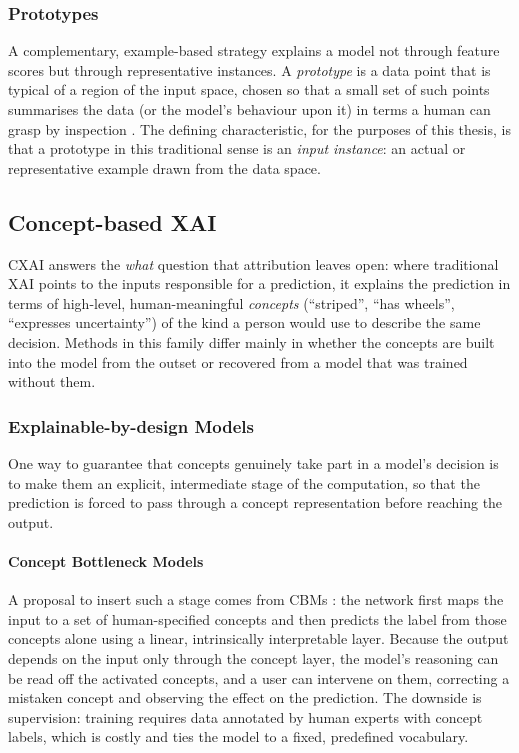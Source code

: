\subsubsection{Prototypes}
\label{sec:background:xai:trad-xai:prototypes}

A complementary, example-based strategy explains a model not through feature
scores but through representative instances. A \textit{prototype} is a data
point that is typical of a region of the input space, chosen so that a small set
of such points summarises the data (or the model's behaviour upon it) in terms a
human can grasp by inspection \citep{kimExamplesAreNot2016}. The defining
characteristic, for the purposes of this thesis, is that a prototype in this
traditional sense is an \textit{input instance}: an actual or representative
example drawn from the data space.

\subsection{Concept-based XAI} \label{sec:background:xai:c-xai}

\Ac{CXAI} answers the \textit{what} question that attribution leaves open: where
traditional \ac{XAI} points to the inputs responsible for a prediction, it
explains the prediction in terms of high-level, human-meaningful
\textit{concepts} (``striped'', ``has wheels'', ``expresses uncertainty'') of
the kind a person would use to describe the same decision. Methods in this
family differ mainly in whether the concepts are built into the model from the
outset or recovered from a model that was trained without them.

\subsubsection{Explainable-by-design Models}

One way to guarantee that concepts genuinely take part in a model's decision is
to make them an explicit, intermediate stage of the computation, so that the
prediction is forced to pass through a concept representation before reaching
the output.

    \paragraph{Concept Bottleneck Models} A proposal to insert such a stage
    comes from \acp{CBM} \citep{kohConceptBottleneckModels2020}: the network
    first maps the input to a set of human-specified concepts and then predicts
    the label from those concepts alone using a linear, intrinsically
    interpretable layer. Because the output depends on the input only through
    the concept layer, the model's reasoning can be read off the activated
    concepts, and a user can intervene on them, correcting a mistaken concept
    and observing the effect on the prediction. The downside is supervision:
    training  requires data annotated by human experts with concept
    labels, which is costly and ties the model to a fixed, predefined
    vocabulary.

